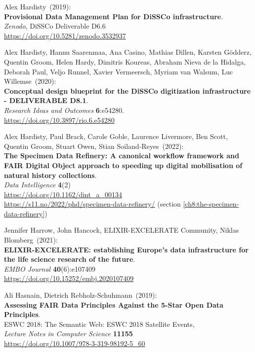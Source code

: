 \begin{thebibliography}{9}
Alex Hardisty~(2019): \\
\textbf{Provisional Data Management Plan for DiSSCo infrastructure}.\\ 
\emph{Zenodo}, DiSSCo Deliverable D6.6\\
\url{https://doi.org/10.5281/zenodo.3532937}

Alex Hardisty, Hannu Saarenmaa, Ana Casino, Mathias Dillen, Karsten Gödderz, Quentin Groom, Helen Hardy, Dimitris Koureas, Abraham Nieva de la Hidalga, Deborah Paul, Veljo Runnel, Xavier Vermeersch, Myriam van Walsum, Luc Willemse~(2020): \\
\textbf{Conceptual design blueprint for the DiSSCo
digitization infrastructure - DELIVERABLE D8.1}.\\ 
\emph{Research Ideas and Outcomes} \textbf{6}:e54280.\\
\url{https://doi.org/10.3897/rio.6.e54280}

Alex Hardisty, Paul Brack, Carole Goble, Laurence
Livermore, Ben Scott, Quentin Groom, Stuart Owen, Stian Soiland-Reyes~(2022): \\
\textbf{The Specimen Data Refinery: A
canonical workflow framework and FAIR Digital Object approach to
speeding up digital mobilisation of natural history collections}.\\
\emph{Data Intelligence} \textbf{4}(2)\\
\url{https://doi.org/10.1162/dint_a_00134}\\
\url{https://s11.no/2022/phd/specimen-data-refinery/}
(section \vref{ch8:the-specimen-data-refinery})

Jennifer Harrow, John Hancock, ELIXIR-EXCELERATE Community,
Niklas Blomberg~(2021): \\
\textbf{ELIXIR-EXCELERATE: establishing Europe's data
infrastructure for the life science research of the future}.\\
\emph{EMBO Journal} \textbf{40}(6):e107409\\
\url{https://doi.org/10.15252/embj.2020107409}

Ali Hasnain, Dietrich Rebholz-Schuhmann~(2019): \\
\textbf{Assessing FAIR Data Principles Against the 5-Star Open Data
Principles}.\\
ESWC 2018: The Semantic Web: ESWC 2018 Satellite Events,\\
\emph{Lecture Notes in Computer Science} \textbf{11155}\\
\url{https://doi.org/10.1007/978-3-319-98192-5_60}


\end{thebibliography}
